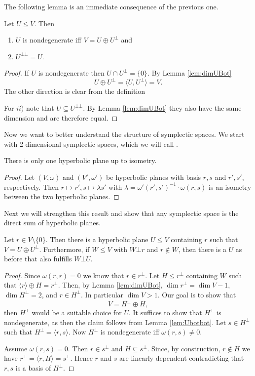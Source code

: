 The following lemma is an immediate consequence of the previous one.
\begin{lemma}\label{lem:Ubotbot}
Let $U\leq V$. Then
\begin{enumerate}[label=\roman{*})]
\item $U$ is nondegenerate iff $V=U\oplus U^\bot$ and
\item $U^{\bot\bot}=U$.
\end{enumerate}
\end{lemma}
\begin{proof}
If $U$ is nondegenerate then $U\cap U^\bot=\{0\}$. By Lemma \ref{lem:dimUBot} \[U\oplus U^\bot=\langle U,U^\bot\rangle=V.\]
The other direction is clear from the definition

For $ii)$ note that $U\subseteq U^{\bot\bot}$. By Lemma \ref{lem:dimUBot} they also have the same dimension and are therefore equal.
\end{proof}

Now we want to better understand the structure of symplectic spaces. 
We start with 2-dimensional symplectic spaces, which we will call .


\begin{lemma}\label{lem:oneHypPlane}
There is only one hyperbolic plane up to isometry.
\end{lemma}
\begin{proof}
Let $(V,\omega)$ and $(V',\omega')$ be hyperbolic planes with basis $r,s$ and $r',s'$, respectively. 
Then $r\mapsto r', s\mapsto \lambda s'$ with $\lambda=\omega'(r',s')^{-1}\cdot\omega(r,s)$ is an isometry between the two hyperbolic planes. 
\end{proof}
Next we will strengthen this result and show that any symplectic space is the direct sum of hyperbolic planes.

\begin{theorem}\label{thm:hypDecomp}
Let $r\in V\setminus\{0\}$. Then there is a hyperbolic plane $U\leq V$ containing $r$ such that $V=U\oplus U^\bot$. Furthermore, if $W\leq V$ with $W\bot r$ and $r\notin W$, then there is a $U$ as before that also fulfills $W\bot U$.
\end{theorem}
\begin{proof}
Since $\omega(r,r)=0$ we know that $r\in r^\bot$. Let $H\leq r^\bot$ containing $W$ such that $\langle r\rangle\oplus H=r^\bot$. Then, by Lemma \ref{lem:dimUBot}, $\dim r^\bot=\dim V-1$, $\dim H^\bot=2$, and $r\in H^\bot$. In particular $\dim V>1$.
Our goal is to show that \[V=H^\bot\oplus H,\] then $H^\bot$ would be a suitable choice for $U$.
It suffices to show that $H^\bot$ is nondegenerate, as then the claim follows from Lemma \ref{lem:Ubotbot}. Let $s\in H^\bot$ such that $H^\bot=\langle r,s\rangle$. Now $H^\bot$ is nondegenerate iff $\omega(r,s)\not=0$. 

Assume $\omega(r,s)=0$. Then $r\in s^\bot$ and $H\subseteq s^\bot$. Since, by construction, $r\notin H$ we have $r^\bot=\langle r,H\rangle=s^\bot$. Hence $r$ and $s$ are linearly dependent contradicting that $r,s$ is a basis of $H^\bot$.

\end{proof}

